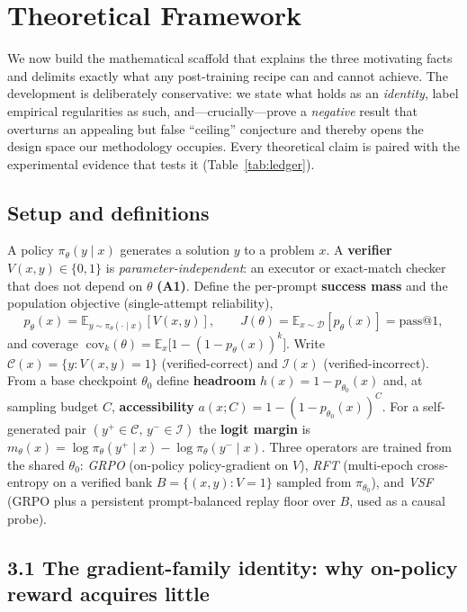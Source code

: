 \section*{Theoretical Framework}

We now build the mathematical scaffold that explains the three motivating facts
and delimits exactly what any post-training recipe can and cannot achieve. The
development is deliberately conservative: we state what holds as an \emph{identity},
label empirical regularities as such, and---crucially---prove a
\emph{negative} result that overturns an appealing but false ``ceiling''
conjecture and thereby opens the design space our methodology occupies. Every
theoretical claim is paired with the experimental evidence that tests it
(Table~\ref{tab:ledger}).

\subsection*{Setup and definitions}

A policy $\pi_\theta(y\mid x)$ generates a solution $y$ to a problem $x$. A
\textbf{verifier} $V(x,y)\in\{0,1\}$ is \emph{parameter-independent}: an executor
or exact-match checker that does not depend on $\theta$ \textbf{(A1)}. Define the
per-prompt \textbf{success mass} and the population objective (single-attempt
reliability),
\[
p_\theta(x)=\mathbb{E}_{y\sim\pi_\theta(\cdot\mid x)}[V(x,y)],
\qquad
J(\theta)=\mathbb{E}_{x\sim\mathcal{D}}[p_\theta(x)]=\text{pass}@1,
\]
and coverage $\;\mathrm{cov}_k(\theta)=\mathbb{E}_x\!\big[1-(1-p_\theta(x))^{k}\big]$.
Write $\mathcal{C}(x)=\{y:V(x,y)=1\}$ (verified-correct) and $\mathcal{I}(x)$
(verified-incorrect). From a base checkpoint $\theta_0$ define \textbf{headroom}
$h(x)=1-p_{\theta_0}(x)$ and, at sampling budget $C$, \textbf{accessibility}
$a(x;C)=1-(1-p_{\theta_0}(x))^{C}$. For a self-generated pair
$(y^{+}\!\in\!\mathcal{C},\,y^{-}\!\in\!\mathcal{I})$ the \textbf{logit margin} is
$m_\theta(x)=\log\pi_\theta(y^{+}\!\mid x)-\log\pi_\theta(y^{-}\!\mid x)$. Three
operators are trained from the shared $\theta_0$: \emph{GRPO} (on-policy
policy-gradient on $V$), \emph{RFT} (multi-epoch cross-entropy on a verified bank
$B=\{(x,y):V=1\}$ sampled from $\pi_{\theta_0}$), and \emph{VSF} (GRPO plus a
persistent prompt-balanced replay floor over $B$, used as a causal probe).

\subsection*{3.1 The gradient-family identity: why on-policy reward acquires little}

